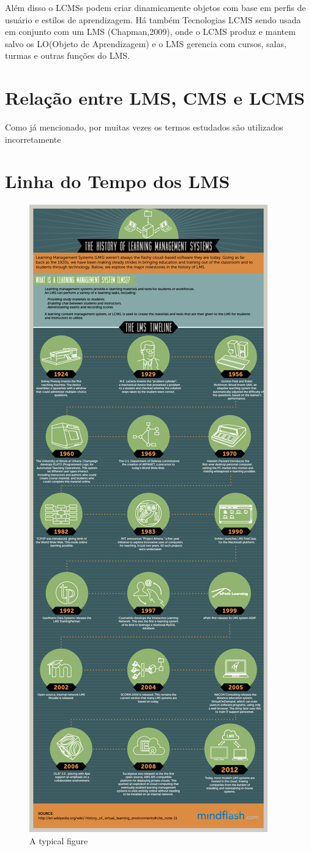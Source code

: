 \documentclass[12pt]{article}
\begin{document}
Além disso o LCMSs podem criar dinamicamente objetos com base em perfis de usuário e estilos de aprendizagem. Há também Tecnologias LCMS sendo usada em conjunto com um LMS (Chapman,2009), onde o LCMS produz e mantem salvo os LO(Objeto de Aprendizagem) e o LMS gerencia com cursos, salas, turmas e outras funções do LMS.

\section{Relação entre LMS, CMS e LCMS}
 
Como já mencionado, por muitas vezes os termos estudados são utilizados incorretamente




\newpage
\appendix
\section{Linha do Tempo dos LMS}

\begin{figure}[ht]
\centering
\includegraphics[width=.55\textwidth]{history-of-lms.png}
\caption{A typical figure}
\label{fig:exampleFig1}
\end{figure}
\end{document}
